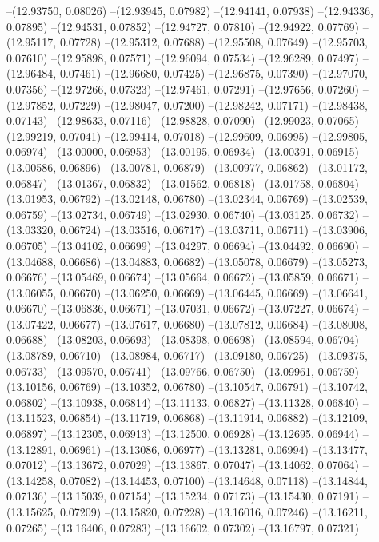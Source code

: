 --(12.93750, 0.08026)
--(12.93945, 0.07982)
--(12.94141, 0.07938)
--(12.94336, 0.07895)
--(12.94531, 0.07852)
--(12.94727, 0.07810)
--(12.94922, 0.07769)
--(12.95117, 0.07728)
--(12.95312, 0.07688)
--(12.95508, 0.07649)
--(12.95703, 0.07610)
--(12.95898, 0.07571)
--(12.96094, 0.07534)
--(12.96289, 0.07497)
--(12.96484, 0.07461)
--(12.96680, 0.07425)
--(12.96875, 0.07390)
--(12.97070, 0.07356)
--(12.97266, 0.07323)
--(12.97461, 0.07291)
--(12.97656, 0.07260)
--(12.97852, 0.07229)
--(12.98047, 0.07200)
--(12.98242, 0.07171)
--(12.98438, 0.07143)
--(12.98633, 0.07116)
--(12.98828, 0.07090)
--(12.99023, 0.07065)
--(12.99219, 0.07041)
--(12.99414, 0.07018)
--(12.99609, 0.06995)
--(12.99805, 0.06974)
--(13.00000, 0.06953)
--(13.00195, 0.06934)
--(13.00391, 0.06915)
--(13.00586, 0.06896)
--(13.00781, 0.06879)
--(13.00977, 0.06862)
--(13.01172, 0.06847)
--(13.01367, 0.06832)
--(13.01562, 0.06818)
--(13.01758, 0.06804)
--(13.01953, 0.06792)
--(13.02148, 0.06780)
--(13.02344, 0.06769)
--(13.02539, 0.06759)
--(13.02734, 0.06749)
--(13.02930, 0.06740)
--(13.03125, 0.06732)
--(13.03320, 0.06724)
--(13.03516, 0.06717)
--(13.03711, 0.06711)
--(13.03906, 0.06705)
--(13.04102, 0.06699)
--(13.04297, 0.06694)
--(13.04492, 0.06690)
--(13.04688, 0.06686)
--(13.04883, 0.06682)
--(13.05078, 0.06679)
--(13.05273, 0.06676)
--(13.05469, 0.06674)
--(13.05664, 0.06672)
--(13.05859, 0.06671)
--(13.06055, 0.06670)
--(13.06250, 0.06669)
--(13.06445, 0.06669)
--(13.06641, 0.06670)
--(13.06836, 0.06671)
--(13.07031, 0.06672)
--(13.07227, 0.06674)
--(13.07422, 0.06677)
--(13.07617, 0.06680)
--(13.07812, 0.06684)
--(13.08008, 0.06688)
--(13.08203, 0.06693)
--(13.08398, 0.06698)
--(13.08594, 0.06704)
--(13.08789, 0.06710)
--(13.08984, 0.06717)
--(13.09180, 0.06725)
--(13.09375, 0.06733)
--(13.09570, 0.06741)
--(13.09766, 0.06750)
--(13.09961, 0.06759)
--(13.10156, 0.06769)
--(13.10352, 0.06780)
--(13.10547, 0.06791)
--(13.10742, 0.06802)
--(13.10938, 0.06814)
--(13.11133, 0.06827)
--(13.11328, 0.06840)
--(13.11523, 0.06854)
--(13.11719, 0.06868)
--(13.11914, 0.06882)
--(13.12109, 0.06897)
--(13.12305, 0.06913)
--(13.12500, 0.06928)
--(13.12695, 0.06944)
--(13.12891, 0.06961)
--(13.13086, 0.06977)
--(13.13281, 0.06994)
--(13.13477, 0.07012)
--(13.13672, 0.07029)
--(13.13867, 0.07047)
--(13.14062, 0.07064)
--(13.14258, 0.07082)
--(13.14453, 0.07100)
--(13.14648, 0.07118)
--(13.14844, 0.07136)
--(13.15039, 0.07154)
--(13.15234, 0.07173)
--(13.15430, 0.07191)
--(13.15625, 0.07209)
--(13.15820, 0.07228)
--(13.16016, 0.07246)
--(13.16211, 0.07265)
--(13.16406, 0.07283)
--(13.16602, 0.07302)
--(13.16797, 0.07321)
